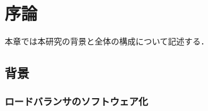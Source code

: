 \chapter{序論}
\label{introduction}
本章では本研究の背景と全体の構成について記述する．

\section{背景}
\label{introduction:background}



\subsection{ロードバランサのソフトウェア化}









